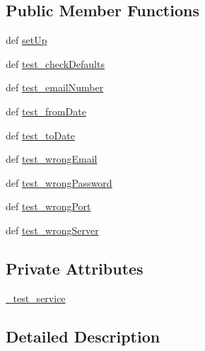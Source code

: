 \subsection*{Public Member Functions}
\begin{DoxyCompactItemize}
\item 
def \hyperlink{classemail__receiver__unit__tests_1_1TestEmailReceiver_ade0ea34c686889ce63005ed5a4a86f9e}{set\-Up}
\item 
def \hyperlink{classemail__receiver__unit__tests_1_1TestEmailReceiver_a514d6e848fa6d3b46b403740ed65e7d6}{test\-\_\-check\-Defaults}
\item 
def \hyperlink{classemail__receiver__unit__tests_1_1TestEmailReceiver_ad57d2c27988ec04b785fb7741d8f181f}{test\-\_\-email\-Number}
\item 
def \hyperlink{classemail__receiver__unit__tests_1_1TestEmailReceiver_a051129fab9ea11f025e51344d9ba786d}{test\-\_\-from\-Date}
\item 
def \hyperlink{classemail__receiver__unit__tests_1_1TestEmailReceiver_ac58232fe5bbc262e42b64239a0c449c7}{test\-\_\-to\-Date}
\item 
def \hyperlink{classemail__receiver__unit__tests_1_1TestEmailReceiver_a6e95a4598dbb2000dd608a452ca5b88c}{test\-\_\-wrong\-Email}
\item 
def \hyperlink{classemail__receiver__unit__tests_1_1TestEmailReceiver_a4dabf2c09354994a16075d5904fd9f38}{test\-\_\-wrong\-Password}
\item 
def \hyperlink{classemail__receiver__unit__tests_1_1TestEmailReceiver_a4795c298c5dbe5cb832138093ff000cf}{test\-\_\-wrong\-Port}
\item 
def \hyperlink{classemail__receiver__unit__tests_1_1TestEmailReceiver_a0165cf20ef4024d68c949b8838f46f2d}{test\-\_\-wrong\-Server}
\end{DoxyCompactItemize}
\subsection*{Private Attributes}
\begin{DoxyCompactItemize}
\item 
\hyperlink{classemail__receiver__unit__tests_1_1TestEmailReceiver_a0246ed69fd72136efeabadf4d98824e0}{\-\_\-test\-\_\-service}
\end{DoxyCompactItemize}


\subsection{Detailed Description}


